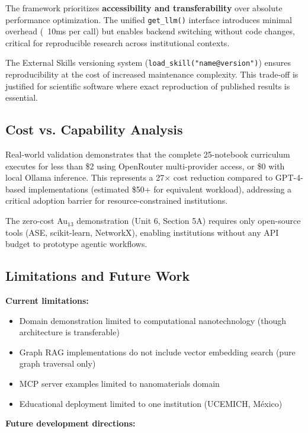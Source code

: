 \documentclass[11pt]{article}
\newcommand{\code}[1]{\texttt{#1}}
\begin{document}
The framework prioritizes \textbf{accessibility and transferability} over absolute performance optimization. The unified \code{get\_llm()} interface introduces minimal overhead (~10ms per call) but enables backend switching without code changes, critical for reproducible research across institutional contexts.

The External Skills versioning system (\code{load\_skill("name@version")}) ensures reproducibility at the cost of increased maintenance complexity. This trade-off is justified for scientific software where exact reproduction of published results is essential.

\subsection{Cost vs. Capability Analysis}

Real-world validation demonstrates that the complete 25-notebook curriculum executes for less than \$2 using OpenRouter multi-provider access, or \$0 with local Ollama inference. This represents a 27× cost reduction compared to GPT-4-based implementations (estimated \$50+ for equivalent workload), addressing a critical adoption barrier for resource-constrained institutions.

The zero-cost Au$_{13}$ demonstration (Unit 6, Section 5A) requires only open-source tools (ASE, scikit-learn, NetworkX), enabling institutions without any API budget to prototype agentic workflows.

\subsection{Limitations and Future Work}

\textbf{Current limitations:}

\begin{itemize}
    \item Domain demonstration limited to computational nanotechnology (though architecture is transferable)
    \item Graph RAG implementations do not include vector embedding search (pure graph traversal only)
    \item MCP server examples limited to nanomaterials domain
    \item Educational deployment limited to one institution (UCEMICH, México)
\end{itemize}

\textbf{Future development directions:}
\end{document}

